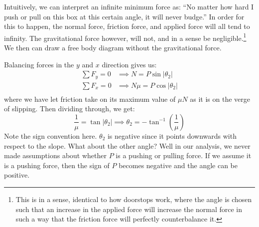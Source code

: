 \documentclass{article}
\begin{document}
Intuitively, we can interpret an infinite minimum force as: ``No matter how hard I push or pull on this box at this certain angle, it will never budge.'' In order for this to happen, the normal force, friction force, and applied force will all tend to infinity. The gravitational force however, will not, and in a sense be negligible.\footnote{This is in a sense, identical to how doorstops work, where the angle is chosen such that an increase in the applied force will increase the normal force in such a way that the friction force will perfectly counterbalance it.} We then can draw a free body diagram without the gravitational force.
\begin{center}
\end{center}
Balancing forces in the $y$ and $x$ direction gives us:
\begin{align}
    \sum F_y = 0 &\implies N=P\sin|\theta_2| \\ 
    \sum F_x = 0 &\implies N\mu=P\cos|\theta_2| \\ 
\end{align}
where we have let friction take on its maximum value of $\mu N$ as it is on the verge of slipping. Then dividing through, we get:
\begin{equation}
    \frac{1}{\mu}=\tan|\theta_2| \implies \theta_2 = -\tan^{-1}\left(\frac{1}{\mu}\right) 
    \label{eq:optimized angle}
\end{equation}
Note the sign convention here. $\theta_2$ is negative since it points downwards with respect to the slope. What about the other angle? Well in our analysis, we never made assumptions about whether $P$ is a pushing or pulling force. If we assume it is a pushing force, then the sign of $P$ becomes negative and the angle can be positive.
\end{document}
